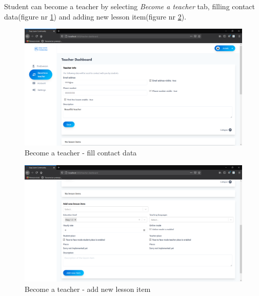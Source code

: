 Student can become a teacher by selecting \textit{Become a teacher} tab, filling contact data(figure nr \ref{fig:BecomeATeacher1}) and adding new lesson item(figure nr \ref{fig:BecomeATeacher2}).
\begin{figure}[H]
    \centering
    \includegraphics[width=\textwidth]{Include/Resources/Frontend/BecomeATeacher1.png}
    \caption{Become a teacher - fill contact data} 
    \label{fig:BecomeATeacher1}
\end{figure}

\begin{figure}[H]
    \centering
    \includegraphics[width=\textwidth]{Include/Resources/Frontend/BecomeATeacher2.png}
    \caption{Become a teacher - add new lesson item} 
    \label{fig:BecomeATeacher2}
\end{figure}

